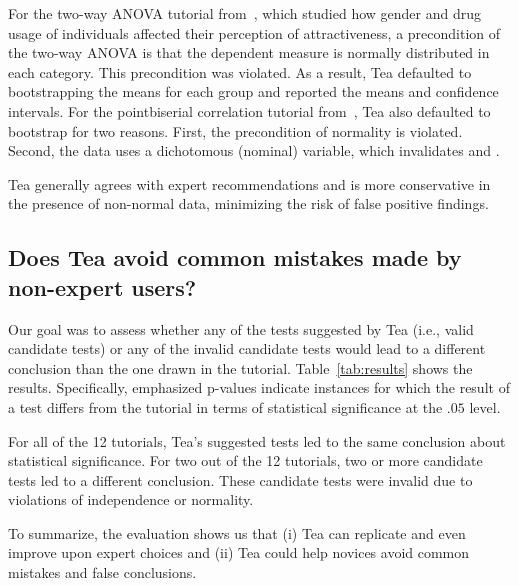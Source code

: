 For the two-way ANOVA tutorial from~\cite{field2012discoveringR}, which studied how gender
and drug usage of individuals affected their perception of attractiveness, a
precondition of the two-way ANOVA is that the dependent measure is normally
distributed in each category. This precondition was violated.  As a result, Tea
defaulted to bootstrapping the means for each group and reported the means and
confidence intervals. 
For the pointbiserial correlation tutorial from~\cite{field2012discoveringR},
Tea also defaulted to bootstrap for two reasons. First, the precondition of
normality is violated. Second, the data uses a dichotomous (nominal) variable,
which invalidates \srho and \ktau.

Tea generally agrees with expert recommendations and is more conservative
in the presence of non-normal data, minimizing the risk of false positive
findings.

\subsection{Does Tea avoid common mistakes made by non-expert users?}
Our goal was to assess whether any of the tests suggested by Tea (i.e., valid
candidate tests) or any of the invalid candidate tests would lead to a different
conclusion than the one drawn in the tutorial. Table~\ref{tab:results} shows the
results. Specifically, emphasized p-values indicate instances for which the
result of a test differs from the tutorial in terms of statistical significance
at the $.05$ level.

For all of the 12 tutorials, Tea's suggested tests led to the same conclusion
about statistical significance. For two out of the 12 tutorials, two or more
candidate tests led to a different conclusion. These candidate tests were
invalid due to violations of independence or normality.

To summarize, the evaluation shows us that (i) Tea can replicate and even improve
upon expert choices and (ii) Tea could help novices avoid common mistakes and
false conclusions.